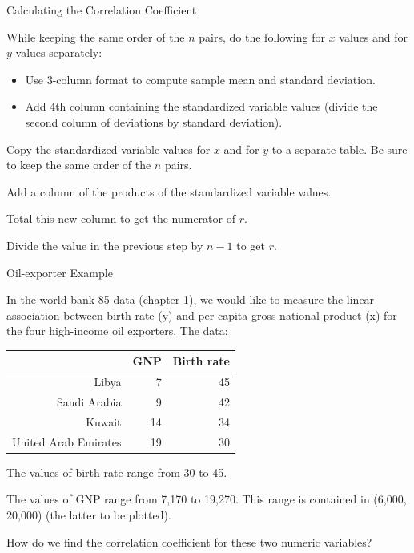 \documentclass[14pt]{beamer}\usepackage[]{graphicx}\usepackage[]{color}
\begin{document}
\begin{frame}[fragile]{Calculating the Correlation Coefficient}

\begin{itemize}
{\small{
  \item While keeping the same order of the $n$ pairs, do the following for $x$
values and for $y$ values separately:
  \begin{itemize}
  \item Use 3-column format to compute sample mean and standard  deviation.
  \item Add 4th column containing the standardized variable values (divide  the second column of deviations by standard deviation).
  \end{itemize}
\item Copy the standardized variable values for $x$ and for $y$ to a  separate table. Be sure to keep the same order of the $n$ pairs.
\item Add a column of the products of the standardized variable values.  
\item Total this new column to get the numerator of $r$.
\item Divide the value in the previous step by $n - 1$ to get $r$.
}}
\end{itemize} 
\end{frame}

\begin{frame}[fragile]{Oil-exporter Example}

{\footnotesize{
In the world bank 85 data (chapter 1), we would like to measure the linear  association between birth rate (y) and per capita gross national product  (x) for the four high-income oil exporters. The data:
}}

{\footnotesize{
\begin{table}[ht]
\centering
\begin{tabular}{rrr}
  \hline
 & GNP & Birth rate \\ 
  \hline
Libya & 7 & 45 \\ 
  Saudi Arabia & 9 & 42 \\ 
  Kuwait & 14 & 34 \\ 
  United Arab Emirates & 19 & 30 \\ 
   \hline
\end{tabular}
\end{table}

}}

\begin{itemize}
{\small{
\item The values of birth rate range from 30 to 45.

\item The values of GNP range from 7,170 to 19,270. This range is  contained in (6,000, 20,000) (the latter to be plotted).
\item How do we find the correlation coefficient for these two numeric variables?
}}
\end{itemize}
\end{frame}
\end{document}
